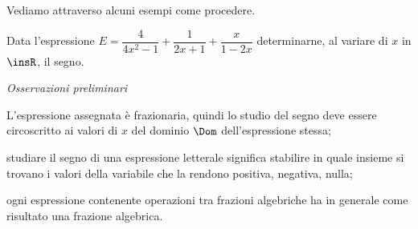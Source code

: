 Vediamo attraverso alcuni esempi come procedere.
\begin{exrig}
\begin{esempio}
Data l'espressione $E=\dfrac 4{4x^2-1}+\dfrac 1{2x+1}+\dfrac x{1-2x}$ determinarne, al variare di $x$ in $\insR$, il segno.

\emph{Osservazioni preliminari}
\begin{itemize*}
\item L'espressione assegnata è frazionaria, quindi lo studio del segno deve essere circoscritto ai valori di $x$ del dominio $\Dom$ dell'espressione stessa;
\item studiare il segno di una espressione letterale significa stabilire in quale insieme si trovano i valori della variabile che la rendono positiva, negativa, nulla;
\item ogni espressione contenente operazioni tra frazioni algebriche ha in generale come risultato una frazione algebrica.
\end{itemize*}


\end{esempio}
\end{exrig}
